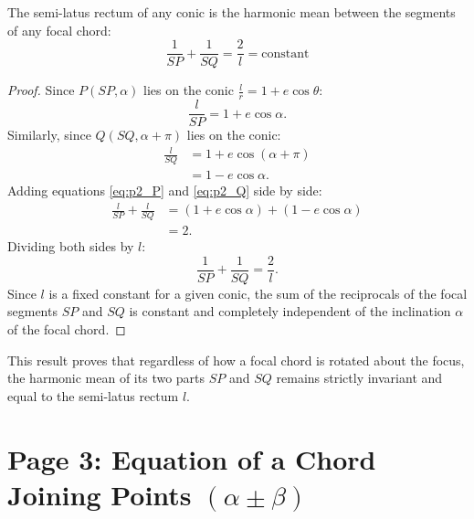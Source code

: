 \begin{theorembox}
The semi-latus rectum of any conic is the harmonic mean between the segments of any focal chord:
\begin{equation}
    \boxed{\frac{1}{SP} + \frac{1}{SQ} = \frac{2}{l} = \text{constant}}
\end{equation}
\end{theorembox}

\begin{proof}
Since $P(SP, \alpha)$ lies on the conic $\frac{l}{r} = 1 + e\cos\theta$:
\begin{equation}
    \frac{l}{SP} = 1 + e\cos\alpha. \label{eq:p2_P}
\end{equation}
Similarly, since $Q(SQ, \alpha + \pi)$ lies on the conic:
\begin{align}
    \frac{l}{SQ} &= 1 + e\cos(\alpha + \pi) \nonumber\\
                 &= 1 - e\cos\alpha. \label{eq:p2_Q}
\end{align}
Adding equations \eqref{eq:p2_P} and \eqref{eq:p2_Q} side by side:
\begin{align}
    \frac{l}{SP} + \frac{l}{SQ} &= (1 + e\cos\alpha) + (1 - e\cos\alpha) \nonumber\\
                                &= 2.
\end{align}
Dividing both sides by $l$:
\begin{equation}
    \frac{1}{SP} + \frac{1}{SQ} = \frac{2}{l}.
\end{equation}
Since $l$ is a fixed constant for a given conic, the sum of the reciprocals of the focal segments $SP$ and $SQ$ is constant and completely independent of the inclination $\alpha$ of the focal chord.
\end{proof}

\begin{notebox}
This result proves that regardless of how a focal chord is rotated about the focus, the harmonic mean of its two parts $SP$ and $SQ$ remains strictly invariant and equal to the semi-latus rectum $l$.
\end{notebox}

\newpage
\section{Page 3: Equation of a Chord Joining Points $(\alpha \pm \beta)$}
\label{sec:page03}

